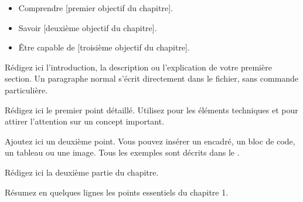 %


\begin{objectifs}
\begin{itemize}
  \item Comprendre [premier objectif du chapitre].
  \item Savoir [deuxième objectif du chapitre].
  \item Être capable de [troisième objectif du chapitre].
\end{itemize}
\end{objectifs}


Rédigez ici l'introduction, la description ou l'explication de votre
première section. Un paragraphe normal s'écrit directement dans le
fichier, sans commande particulière.


Rédigez ici le premier point détaillé. Utilisez 
pour les éléments techniques et  pour attirer
l'attention sur un concept important.


Ajoutez ici un deuxième point. Vous pouvez insérer un encadré, un bloc
de code, un tableau ou une image. Tous les exemples sont décrits dans
le .


Rédigez ici la deuxième partie du chapitre.

\begin{resume}
Résumez en quelques lignes les points essentiels du chapitre 1.
\end{resume}
